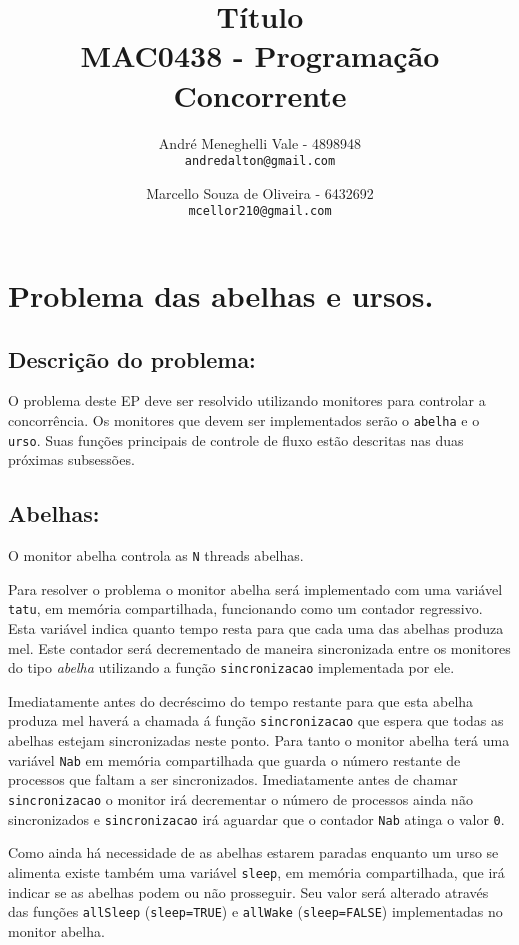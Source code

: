 \documentclass[12pt,a4paper]{article}
\title{Título\\MAC0438 - Programação Concorrente}
\author{
    André Meneghelli Vale - 4898948\\
    \texttt{andredalton@gmail.com}
    \and
    Marcello Souza de Oliveira - 6432692\\
    \texttt{mcellor210@gmail.com}
}
\date{}
\begin{document}
\maketitle

\newpage

\section{Problema das abelhas e ursos.}

\subsection{Descrição do problema:}

O problema deste EP deve ser resolvido utilizando monitores para controlar a concorrência. Os monitores que devem ser implementados serão o \verb+abelha+ e o \verb+urso+. Suas funções principais de controle de fluxo estão descritas nas duas próximas subsessões.

\subsection{Abelhas:}

O monitor abelha controla as \verb+N+ threads abelhas.

Para resolver o problema o monitor abelha será implementado com uma variável \verb+tatu+, em memória compartilhada, funcionando como um contador regressivo. Esta variável indica quanto tempo resta para que cada uma das abelhas produza mel. Este contador será decrementado de maneira sincronizada entre os monitores do tipo \emph{abelha} utilizando a função \verb+sincronizacao+ implementada por ele.

Imediatamente antes do decréscimo do tempo restante para que esta abelha produza mel haverá a chamada á função \verb+sincronizacao+ que espera que todas as abelhas estejam sincronizadas neste ponto. Para tanto o monitor abelha terá uma variável \verb+Nab+ em memória compartilhada que guarda o número restante de processos que faltam a ser sincronizados. Imediatamente antes de chamar \verb+sincronizacao+ o monitor irá decrementar o número de processos ainda não sincronizados e \verb+sincronizacao+ irá aguardar que o contador \verb+Nab+ atinga o valor \verb+0+.

Como ainda há necessidade de as abelhas estarem paradas enquanto um urso se alimenta existe também uma variável \verb+sleep+, em memória compartilhada, que irá indicar se as abelhas podem ou não prosseguir. Seu valor será alterado através das funções \verb+allSleep+ (\verb+sleep=TRUE+) e \verb+allWake+ (\verb+sleep=FALSE+) implementadas no monitor abelha.
\end{document}
